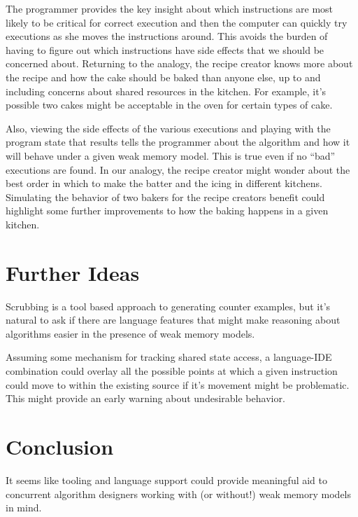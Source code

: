 \documentclass[9pt,twocolumn]{extarticle}
\begin{document}
The programmer provides the key insight about which instructions are most likely to be critical for correct execution and then the computer can quickly try executions as she moves the instructions around. This avoids the burden of having to figure out which instructions have side effects that we should be concerned about. Returning to the analogy, the recipe creator knows more about the recipe and how the cake should be baked than anyone else, up to and including concerns about shared resources in the kitchen. For example, it's possible two cakes might be acceptable in the oven for certain types of cake.

Also, viewing the side effects of the various executions and playing with the program state that results tells the programmer about the algorithm and how it will behave under a given weak memory model. This is true even if no ``bad'' executions are found. In our analogy, the recipe creator might wonder about the best order in which to make the batter and the icing in different kitchens. Simulating the behavior of two bakers for the recipe creators benefit could highlight some further improvements to how the baking happens in a given kitchen.

\vspace{-0.25cm}
\section{Further Ideas}
\vspace{-0.25cm}

Scrubbing is a tool based approach to generating counter examples, but it's natural to ask if there are language features that might make reasoning about algorithms easier in the presence of weak memory models.

Assuming some mechanism for tracking shared state access, a language-IDE combination could overlay all the possible points at which a given instruction could move to within the existing source if it's movement might be problematic. This might provide an early warning about undesirable behavior.

\vspace{-0.25cm}
\section{Conclusion}
\vspace{-0.25cm}

It seems like tooling and language support could provide meaningful aid to concurrent algorithm designers working with (or without!) weak memory models in mind.
\end{document}
